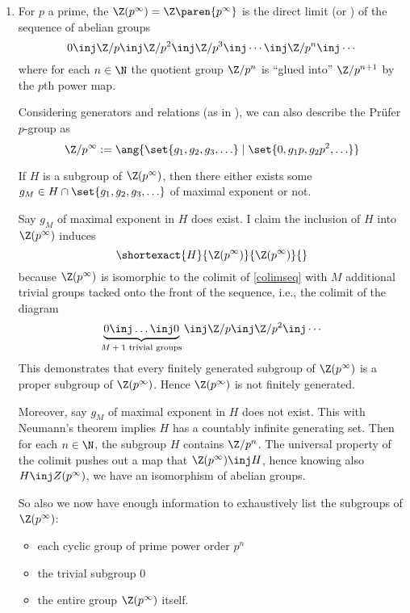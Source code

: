 \documentclass[onesided]{ccg-pset}
\author{Colton Grainger}
\date{\today}
\begin{document}
\maketitle

\begin{enumerate}



\item 
For $p$ a prime, the  $\Z(p^\infty) = \Z\paren{p^{\infty}}$
is the direct limit (or ) of the sequence of abelian groups
\begin{equation}
\label{colimseq}
0 \inj \Z/p \inj \Z/p^2  \inj \Z/p^3 \inj \cdots \inj \Z/p^n \inj \cdots
\end{equation}
where for each $n \in \N$ the quotient group $\Z/p^n$ is ``glued into'' $\Z/p^{n+1}$ by the $p$th power map.

Considering generators and relations (as in \cite{Rie17}), we can also describe the Prüfer $p$-group as
\begin{equation*}
    \Z/p^\infty := \ang{\set{g_1, g_2, g_3, \ldots} \mid \set{0, g_1p, g_2p^2, \ldots} }
\end{equation*}

If $H$ is a subgroup of $\Z(p^{\infty})$, then there either exists some $g_M \in H \cap \set{g_1, g_2, g_3, \ldots}$ of maximal exponent or not. 

Say $g_M$ of maximal exponent in $H$ does exist. I claim the inclusion of $H$ into $\Z(p^\infty)$ induces
\begin{equation*}
    \shortexact{H}{\Z(p^\infty)}{\Z(p^\infty)}{}
\end{equation*}
because $\Z(p^\infty)$ is isomorphic to the colimit of \eqref{colimseq} with $M$ additional trivial groups tacked onto the front of the sequence, i.e., the colimit of the diagram
\begin{equation}
\label{quotientedcolim}
    \underbrace{0 \inj \ldots \inj 0}_\text{$M+1$ trivial groups} \inj \Z/p \inj \Z/p^2 \inj \cdots
\end{equation}
This demonstrates that every finitely generated subgroup of $\Z(p^\infty)$ is a proper subgroup of $\Z(p^\infty)$. Hence $\Z(p^\infty)$ is not finitely generated.

Moreover, say $g_M$ of maximal exponent in $H$ does not exist. This with Neumann's theorem implies $H$ has a countably infinite generating set. Then for each $n \in \N$, the subgroup $H$ contains $\Z/p^n$. The universal property of the colimit pushes out a map that $\Z(p^\infty) \inj H$, hence knowing also $H \inj Z(p^\infty)$, we have an isomorphism of abelian groups.

So also we now have enough information to exhaustively list the subgroups of $\Z(p^\infty)$:
\begin{itemize}
    \item each cyclic group of prime power order $p^n$
    \item the trivial subgroup $0$
    \item the entire group $\Z(p^\infty)$ itself.
\end{itemize}

\end{enumerate}
\end{document}
